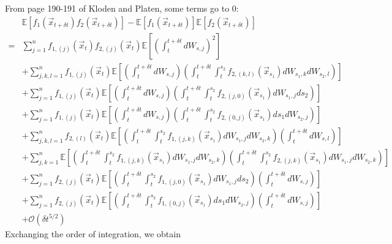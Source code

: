 \documentclass[12pt]{article}
\begin{document}
%
From page 190-191 of Kloden and Platen, some terms go to 0:
%
\begin{equation}
\begin{aligned}
&\mathbb{E} \left[ f_1(\vec{x}_{t + \delta t}) f_2(\vec{x}_{t + \delta t}) \right] 
- \mathbb{E} \left[ f_1(\vec{x}_{t + \delta t}) \right] \mathbb{E} \left[ f_2(\vec{x}_{t + \delta t}) \right] \\
=& 
 \sum_{j=1}^n f_{1,(j)}(\vec{x}_t) f_{2,(j)}(\vec{x}_t) \mathbb{E} \left[ \left( \int_t^{t + \delta t} dW_{s,j} \right)^2 \right] \\
&+ \sum_{j,k,l=1}^n f_{1,(j)}(\vec{x}_t) \mathbb{E} \left[ \left( \int_t^{t + \delta t} dW_{s,j} \right) \left( \int_t^{t+\delta t} \int_t^{s_2} f_{2,(k,l)}(\vec{x}_{s_1}) dW_{s_1, k} dW_{s_2, l} \right) \right] \\
&+ \sum_{j=1}^n f_{1,(j)}(\vec{x}_t) \mathbb{E} \left[ \left( \int_t^{t + \delta t} dW_{s,j} \right)\left( \int_t^{t+\delta t} \int_t^{s_2} f_{2,(j,0)}(\vec{x}_{s_1}) dW_{s_1, j} ds_2 \right) \right]\\
&+ \sum_{j=1}^n f_{1,(j)}(\vec{x}_t) \mathbb{E} \left[ \left( \int_t^{t + \delta t} dW_{s,j} \right) \left( \int_t^{t+\delta t} \int_t^{s_2} f_{2,(0,j)}(\vec{x}_{s_1}) ds_1 dW_{s_2, j} \right) \right] \\
&+  \sum_{j, k, l=1}^n  f_{2,(l)}(\vec{x}_t)\mathbb{E} \left[ \left( \int_t^{t+\delta t} \int_t^{s_2} f_{1,(j,k)}(\vec{x}_{s_1}) dW_{s_1, j} dW_{s_2, k} \right) \left( \int_t^{t + \delta t} dW_{s,l} \right) \right] \\
&+ \sum_{j, k=1}^n \mathbb{E} \left[ \left( \int_t^{t+\delta t} \int_t^{s_2} f_{1,(j,k)}(\vec{x}_{s_1}) dW_{s_1, j} dW_{s_2, k} \right) \left( \int_t^{t+\delta t} \int_t^{s_2} f_{2,(j,k)}(\vec{x}_{s_1}) dW_{s_1, j} dW_{s_2,k} \right) \right] \\
&+  \sum_{j=1}^n f_{2,(j)}(\vec{x}_t) \mathbb{E} \left[ \left( \int_t^{t+\delta t} \int_t^{s_2} f_{1,(j,0)}(\vec{x}_{s_1}) dW_{s_1, j} ds_2  \right) \left( \int_t^{t + \delta t} dW_{s,j} \right) \right]\\
&+   \sum_{j=1}^n  f_{2,(j)}(\vec{x}_t) \mathbb{E} \left[ \left( \int_t^{t+\delta t} \int_t^{s_2} f_{1,(0,j)}(\vec{x}_{s_1}) ds_1 dW_{s_2, j}  \right) \left(\int_t^{t + \delta t} dW_{s,j} \right) \right] \\
&+ \mathcal{O} (\delta t^{5/2})
\end{aligned}
\end{equation}
%
Exchanging the order of integration, we obtain
%
\end{document}
